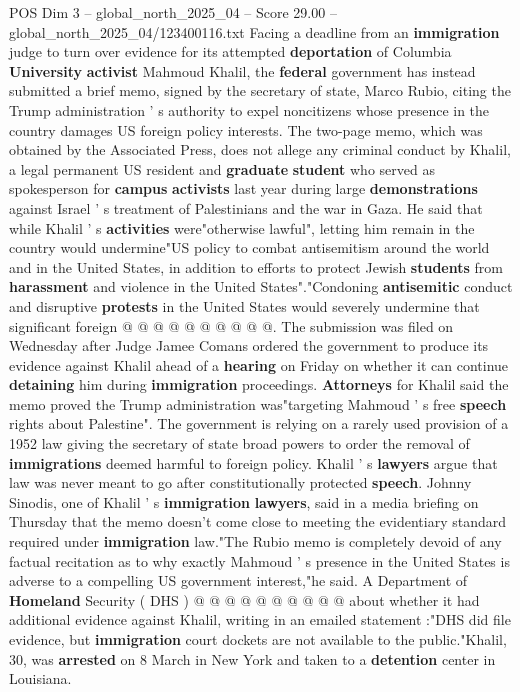 \begin{textsample}{POS Dim 3 – global\_north\_2025\_04 – Score 29.00 – global\_north\_2025\_04/123400116.txt}  \label{ex:f3_pos_058}
Facing a deadline from an \textbf{immigration} judge to turn over evidence for its attempted \textbf{deportation} of Columbia \textbf{University} \textbf{activist} Mahmoud Khalil, the \textbf{federal} government has instead submitted a brief memo, signed by the secretary of state, Marco Rubio, citing the Trump administration ' s authority to expel noncitizens whose presence in the country damages US foreign policy interests.
The two-page memo, which was obtained by the Associated Press, does not allege any criminal conduct by Khalil, a legal permanent US resident and \textbf{graduate} \textbf{student} who served as spokesperson for \textbf{campus} \textbf{activists} last year during large \textbf{demonstrations} against Israel ' s treatment of Palestinians and the war in Gaza.
He said that while Khalil ' s \textbf{activities} were"otherwise lawful", letting him remain in the country would undermine"US policy to combat antisemitism around the world and in the United States, in addition to efforts to protect Jewish \textbf{students} from \textbf{harassment} and violence in the United States"."Condoning \textbf{antisemitic} conduct and disruptive \textbf{protests} in the United States would severely undermine that significant foreign @ @ @ @ @ @ @ @ @ @.
The submission was filed on Wednesday after Judge Jamee Comans ordered the government to produce its evidence against Khalil ahead of a \textbf{hearing} on Friday on whether it can continue \textbf{detaining} him during \textbf{immigration} proceedings. \textbf{Attorneys} for Khalil said the memo proved the Trump administration was"targeting Mahmoud ' s free \textbf{speech} rights about Palestine".
The government is relying on a rarely used provision of a 1952 law giving the secretary of state broad powers to order the removal of \textbf{immigrations} deemed harmful to foreign policy.
Khalil ' s \textbf{lawyers} argue that law was never meant to go after constitutionally protected \textbf{speech}.
Johnny Sinodis, one of Khalil ' s \textbf{immigration} \textbf{lawyers}, said in a media briefing on Thursday that the memo doesn't come close to meeting the evidentiary standard required under \textbf{immigration} law."The Rubio memo is completely devoid of any factual recitation as to why exactly Mahmoud ' s presence in the United States is adverse to a compelling US government interest,"he said.
A Department of \textbf{Homeland} Security ( DHS ) @ @ @ @ @ @ @ @ @ @ about whether it had additional evidence against Khalil, writing in an emailed statement :"DHS did file evidence, but \textbf{immigration} court dockets are not available to the public."Khalil, 30, was \textbf{arrested} on 8 March in New York and taken to a \textbf{detention} center in Louisiana.

\end{textsample}
